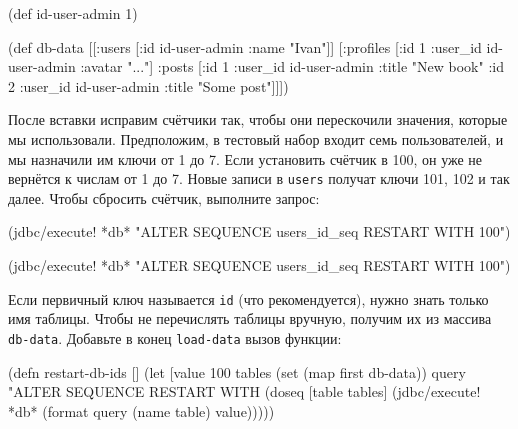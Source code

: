 \else

\begin{english}
  \begin{clojure}
(def id-user-admin 1)

(def db-data
  [[:users [{:id id-user-admin :name "Ivan"}]]
   [:profiles [{:id 1 :user_id id-user-admin :avatar "..."}]
    :posts [{:id 1 :user_id id-user-admin :title "New book"}
            {:id 2 :user_id id-user-admin :title "Some post"}]]])
  \end{clojure}
\end{english}

\fi


После вставки исправим счётчики так, чтобы они перескочили значения, которые мы
использовали. Предположим, в тестовый набор входит семь пользователей, и мы
назначили им ключи от 1 до 7. Если установить счётчик в 100, он уже не вернётся
к числам от 1 до 7. Новые записи в \verb|users| получат ключи 101, 102 и так
далее. Чтобы сбросить счётчик, выполните запрос:

\ifx\devicetype\mobile

\begin{english}
  \begin{clojure}
(jdbc/execute! *db*
  "ALTER SEQUENCE users_id_seq
   RESTART WITH 100")
  \end{clojure}
\end{english}

\else

\begin{english}
  \begin{clojure}
(jdbc/execute! *db*
  "ALTER SEQUENCE users_id_seq RESTART WITH 100")
  \end{clojure}
\end{english}

\fi

Если первичный ключ называется \verb|id| (что рекомендуется), нужно знать
только имя таблицы. Чтобы не перечислять таблицы вручную, получим их из массива
\verb|db-data|. Добавьте в конец \verb|load-data| вызов функции:


\ifx\devicetype\mobile

\begin{english}
  \begin{clojure}
(defn restart-db-ids []
  (let [value 100
        tables (set (map first db-data))
        query "ALTER SEQUENCE %
               RESTART WITH %
    (doseq [table tables]
      (jdbc/execute! *db*
        (format query
          (name table) value)))))
  \end{clojure}
\end{english}

